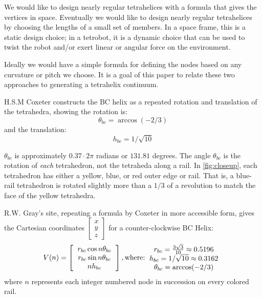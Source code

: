 \documentclass[review]{siamonline1116}
\begin{document}
We would like to design nearly regular tetrahelices with a formula that
gives the vertices in space. Eventually we would like to design nearly regular
tetrahelices by choosing the lengths of a small set of members.
In a space frame, this is a static design choice; in a tetrobot, it is a
dynamic choice that can be used to twist the robot and/or exert linear or
angular force on the environment.

Ideally we would have a simple formula for defining the nodes based on
any curvature or pitch we choose. It is a goal of
this paper to relate these two approaches to generating a tetrahelix
continuum.


H.S.M Coxeter constructs the BC helix\cite{coxeter1985simplicial} as a repeated rotation and translation of the tetrahedra, showing the
rotation is:
\[
\theta_{bc} = \arccos(-2/3) 
\]
and the translation:
\[
h_{bc} = 1/\sqrt{10}
\]

$\theta_{bc}$ is approximately $0.37 \cdot 2 \pi$ radians or  $131.81$ degrees.
The angle $\theta_{bc}$ is the rotation of \emph{each} tetrahedron, not the tetraheda along a rail.  In \cref{fig:closeup},
each tetrahedron has either a yellow, blue, or red outer edge or rail.
That is, a blue-rail tetrahedron is rotated slightly more than a $1/3$ of a revolution to match the face of the yellow tetrahedra.

R.W. Gray's site\cite{graytetrahelix}, repeating a formula by Coxeter\cite{coxeter1985simplicial} in more accessible form, gives the Cartesian coordinates $\begin{bmatrix}
           x \\
           y \\
           z
         \end{bmatrix}$
for a counter-clockwise BC Helix:
\begin{equation}
  \label{graycoxeter}
V(n) =
\left [
  \begin{tabular}{c}
   $ r_{bc} \cos{n \theta_{bc}} $\\
   $ r_{bc} \sin{n \theta_{bc}} $\\
   $ n h_{bc}  $
  \end{tabular}
  \right ],
\text{where:}
  \begin{tabular}{c}
 $ r_{bc} = \frac{3\sqrt{3}}{10} \approx 0.5196 $\\
 $ h_{bc} = 1/\sqrt{10} \approx 0.3162 $ \\
 $ \theta_{bc} = \arccos(-2/3) $ \\
  \end{tabular}      
\end{equation}
where $n$ represents each integer numbered node in succession on every colored rail.
\end{document}
